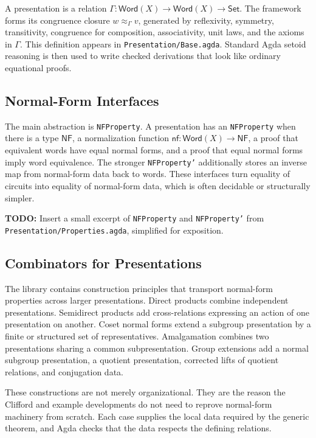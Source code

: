 \documentclass[acmsmall,screen,review,anonymous]{acmart}
\newcommand{\Agda}{Agda\xspace}
\newcommand{\NF}{\mathsf{NF}}
\newcommand{\Word}{\mathsf{Word}}
\newcommand{\code}[1]{\texttt{#1}}
\newcommand{\codepath}[1]{\nolinkurl{#1}}
\newcommand{\todo}[1]{\textbf{TODO:} #1}
\begin{document}
A presentation is a relation \(\Gamma : \Word(X) \to \Word(X) \to \mathsf{Set}\).
The framework forms its congruence closure \(w \approx_\Gamma v\), generated by
reflexivity, symmetry, transitivity, congruence for composition, associativity,
unit laws, and the axioms in \(\Gamma\). This definition appears in
\code{Presentation/Base.agda}. Standard \Agda setoid reasoning is then used to
write checked derivations that look like ordinary equational proofs.

\subsection{Normal-Form Interfaces}

The main abstraction is \code{NFProperty}. A presentation has an
\code{NFProperty} when there is a type \(\NF\), a normalization function
\(\mathsf{nf} : \Word(X) \to \NF\), a proof that equivalent words have equal
normal forms, and a proof that equal normal forms imply word equivalence. The
stronger \code{NFProperty'} additionally stores an inverse map from normal-form
data back to words. These interfaces turn equality of circuits into equality of
normal-form data, which is often decidable or structurally simpler.

\todo{Insert a small excerpt of \code{NFProperty} and \code{NFProperty'} from
\codepath{Presentation/Properties.agda}, simplified for exposition.}

\subsection{Combinators for Presentations}

The library contains construction principles that transport normal-form
properties across larger presentations. Direct products combine independent
presentations. Semidirect products add cross-relations expressing an action of
one presentation on another. Coset normal forms extend a subgroup presentation
by a finite or structured set of representatives. Amalgamation combines two
presentations sharing a common subpresentation. Group extensions add a normal
subgroup presentation, a quotient presentation, corrected lifts of quotient
relations, and conjugation data.

These constructions are not merely organizational. They are the reason the
Clifford and example developments do not need to reprove normal-form machinery
from scratch. Each case supplies the local data required by the generic theorem,
and \Agda checks that the data respects the defining relations.
\end{document}
